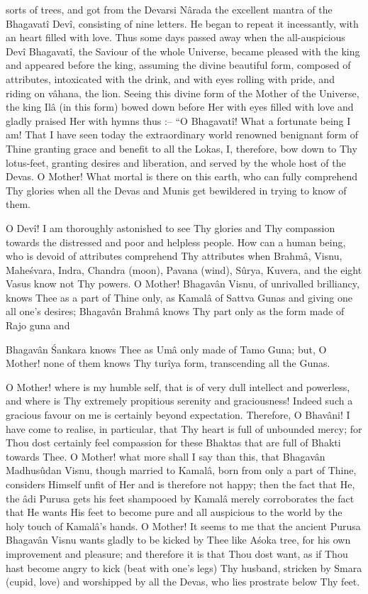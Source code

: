 sorts of trees, and got from the Devarsi N\^arada the excellent mantra of the Bhagavat\^i Dev\^i, consisting of nine letters. He began to repeat it incessantly, with an heart filled with love. Thus some days passed away when the all-auspicious Dev\^i Bhagavat\^i, the Saviour of the whole Universe, became pleased with the king and appeared before the king, assuming the divine beautiful form, composed of attributes, intoxicated with the drink, and with eyes rolling with pride, and riding on v\^ahana, the lion. Seeing this divine form of the Mother of the Universe, the king Il\^a (in this form) bowed down before Her with eyes filled with love and gladly praised Her with hymns thus :-- ``O Bhagavat\^i! What a fortunate being I am! That I have seen today the extraordinary world renowned benignant form of Thine granting grace and benefit to all the Lokas, I, therefore, bow down to Thy lotus-feet, granting desires and liberation, and served by the whole host of the Devas. O Mother! What mortal is there on this earth, who can fully comprehend Thy glories when all the Devas and Munis get bewildered in trying to know of them.

O Dev\^i! I am thoroughly astonished to see Thy glories and Thy compassion towards the distressed and poor and helpless people. How can a human being, who is devoid of attributes comprehend Thy attributes when Brahm\^a, Visnu, Mahe\'svara, Indra, Chandra (moon), Pavana (wind), S\^urya, Kuvera, and the eight Vasus know not Thy powers. O Mother! Bhagav\^an Visnu, of unrivalled brilliancy, knows Thee as a part of Thine only, as Kamal\^a of Sattva Gunas and giving one all one's desires; Bhagav\^an Brahm\^a knows Thy part only as the form made of Rajo guna and

Bhagav\^an \'Sankara knows Thee as Um\^a only made of Tamo Guna; but, O Mother! none of them knows Thy tur\^iya form, transcending all the Gunas.

O Mother! where is my humble self, that is of very dull intellect and powerless, and where is Thy extremely propitious serenity and graciousness! Indeed such a gracious favour on me is certainly beyond expectation. Therefore, O Bhav\^ani! I have come to realise, in particular, that Thy heart is full of unbounded mercy; for Thou dost certainly feel compassion for these Bhaktas that are full of Bhakti towards Thee. O Mother! what more shall I say than this, that Bhagav\^an Madhus\^udan Visnu, though married to Kamal\^a, born from only a part of Thine, considers Himself unfit of Her and is therefore not happy; then the fact that He, the \^adi Purusa gets his feet shampooed by Kamal\^a merely corroborates the fact that He wants His feet to become pure and all auspicious to the world by the holy touch of Kamal\^a's hands. O Mother! It seems to me that the ancient Purusa Bhagav\^an Visnu wants gladly to be kicked by Thee like A\'soka tree, for his own improvement and pleasure; and therefore it is that Thou dost want, as if Thou hast become angry to kick (beat with one's legs) Thy husband, stricken by Smara (cupid, love) and worshipped by all the Devas, who lies prostrate below Thy feet.

